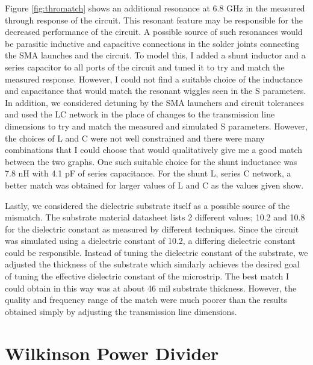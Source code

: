 \documentclass[twocolumn, aps, apl]{revtex4-1}
\begin{document}
Figure \ref{fig:thromatch} shows an additional resonance at 6.8 GHz in the measured through response of the circuit. This resonant feature may be responsible for the decreased performance of the circuit. A possible source of such resonances would be parasitic inductive and capacitive connections in the solder joints connecting the SMA launches and the circuit. To model this, I added a shunt inductor and a series capacitor to all ports of the circuit and tuned it to try and match the measured response. However, I could not find a suitable choice of the inductance and capacitance that would match the resonant wiggles seen in the S parameters. In addition, we considered detuning by the SMA launchers and circuit tolerances and used the LC network in the place of changes to the transmission line dimensions to try and match the measured and simulated S parameters. However, the choices of L and C were not well constrained and there were many combinations that I could choose that would qualitatively give me a good match between the two graphs. One such suitable choice for the shunt inductance was 7.8 nH with 4.1 pF of series capacitance. For the shunt L, series C network, a better match was obtained for larger values of L and C as the values given show. 

Lastly, we considered the dielectric substrate itself as a possible source of the mismatch. The substrate material datasheet lists 2 different values; 10.2 and 10.8 for the dielectric constant as measured by different techniques. Since the circuit was simulated using a dielectric constant of 10.2, a differing dielectric constant could be responsible. Instead of tuning the dielectric constant of the substrate, we adjusted the thickness of the substrate which similarly achieves the desired goal of tuning the effective dielectric constant of the microstrip. The best match I could obtain in this way was at about 46 mil substrate thickness. However, the quality and frequency range of the match were much poorer than the results obtained simply by adjusting the transmission line dimensions.



\FloatBarrier

\section*{Wilkinson Power Divider}\label{sec:Wilkinson}
\end{document}
